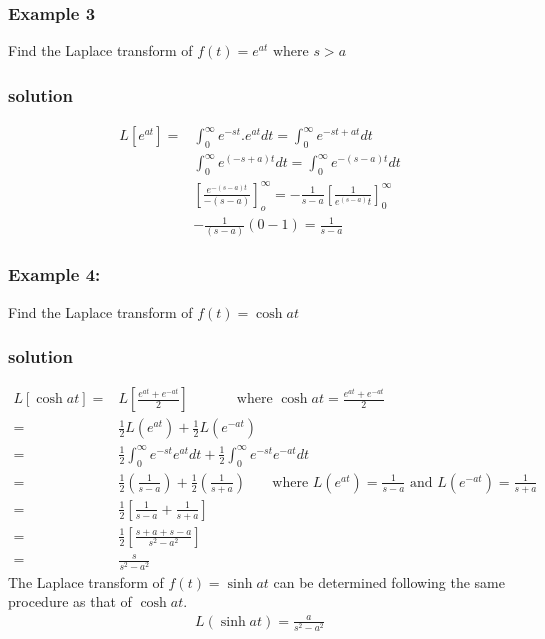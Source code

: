 \documentclass[12pt]{report}
\begin{document}
\subsubsection{Example 3}
Find the Laplace transform of $f(t)=e^{at} \mbox{ where } s> a$
\subsubsection{solution}
\begin{align*}
L[e^{at}]=& \int_0^\infty e^{-st}.e^{at}dt = \int_0^\infty e^{-st+at}dt \\
& \int_0^\infty e^{(-s+a)t}dt = \int_0^\infty e^{-(s-a)t}dt \\
& \left[\frac{e^{-(s-a)t}}{-(s-a)}\right]_o^\infty = -\frac{1}{s-a}\left[\frac{1}{e^{(s-a)}t} \right]_0^\infty \\
& -\frac{1}{(s-a)}\left( 0-1 \right) = \frac{1}{s-a}
\end{align*}

\subsubsection{Example 4:}
Find the Laplace transform of $f(t)= \cosh at$
\subsubsection{solution}
\begin{align*}
L[\cosh at] = & L \left[ \frac{e^{at}+e^{-at}}{2}\right]~~~~~~~~~~~~~~\mbox{ where } \cosh at= \frac{e^{at}+e^{-at}}{2} \\
=& \frac{1}{2}L(e^{at})+ \frac{1}{2}L(e^{-at}) \\
=& \frac{1}{2} \int_0^\infty e^{-st}e^{at} dt + \frac{1}{2} \int_0^\infty e^{-st}e^{-at}dt \\
=& \frac{1}{2} \left( \frac{1}{s-a}\right) + \frac{1}{2} \left( \frac{1}{s+a}\right)~~~~~~~ \mbox{ where } L(e^{at})=\frac{1}{s-a} \mbox{ and } L(e^{-at})=\frac{1}{s+a} \\
=& \frac{1}{2} \left[ \frac{1}{s-a}+\frac{1}{s+a}\right] \\
=& \frac{1}{2} \left[ \frac{s+a+s-a}{s^2-a^2}\right] \\
=& \frac{s}{s^2-a^2}
\end{align*}
The Laplace transform of $f(t)=\sinh at$ can be determined following the same procedure as that of $\cosh at$.
\begin{align*}
L(\sinh at)=\frac{a}{s^2-a^2}
\end{align*}
\end{document}
